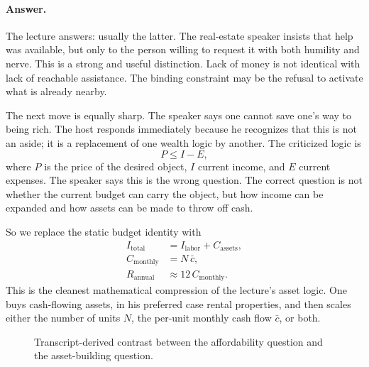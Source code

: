 \paragraph{Answer.} The lecture answers: usually the latter. The real-estate speaker insists that help was available, but only to the person willing to request it with both humility and nerve. This is a strong and useful distinction. Lack of money is not identical with lack of reachable assistance. The binding constraint may be the refusal to activate what is already nearby.

The next move is equally sharp. The speaker says one cannot save one's way to being rich. The host responds immediately because he recognizes that this is not an aside; it is a replacement of one wealth logic by another. The criticized logic is
\begin{equation}
P \le I-E,
\end{equation}
where \(P\) is the price of the desired object, \(I\) current income, and \(E\) current expenses. The speaker says this is the wrong question. The correct question is not whether the current budget can carry the object, but how income can be expanded and how assets can be made to throw off cash.

So we replace the static budget identity with
\begin{align}
I_{\mathrm{total}} &= I_{\mathrm{labor}} + C_{\mathrm{assets}},\\
C_{\mathrm{monthly}} &= N\,\bar c,\\
R_{\mathrm{annual}} &\approx 12\,C_{\mathrm{monthly}}.
\end{align}
This is the cleanest mathematical compression of the lecture's asset logic. One buys cash-flowing assets, in his preferred case rental properties, and then scales either the number of units \(N\), the per-unit monthly cash flow \(\bar c\), or both.

\begin{figure}[h]
\centering
{}
\caption{Transcript-derived contrast between the affordability question and the asset-building question.}
\end{figure}

